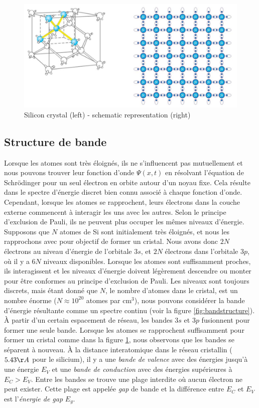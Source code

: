 \begin{figure}[htbp]
	\centering
	\includegraphics[width=12cm]{figures/ch01/crystal.jpg}
	\caption{Silicon crystal (left) - schematic representation (right)}
	\label{fig:crystal}
\end{figure} 

\subsection{Structure de bande}
Lorsque les atomes sont très éloignés, ils ne s'influencent pas mutuellement et nous pouvons trouver leur fonction d'onde $\Psi(x, t)$ en résolvant l'équation de Schrödinger pour un seul électron en orbite autour d'un noyau fixe. Cela résulte dans le spectre d'énergie discret bien connu associé à chaque fonction d'onde. Cependant, lorsque les atomes se rapprochent, leurs électrons dans la couche externe commencent à interagir les uns avec les autres. Selon le principe d'exclusion de Pauli, ils ne peuvent plus occuper les mêmes niveaux d'énergie.\\
Supposons que $N$ atomes de Si sont initialement très éloignés, et nous les rapprochons avec pour objectif de former un cristal. Nous avons donc $2N$ électrons au niveau d'énergie de l'orbitale $3s$, et $2N$ électrons dans l'orbitale $3p$, où il y a $6N$ niveaux disponibles. Lorsque les atomes sont suffisamment proches, ils interagissent et les niveaux d'énergie doivent légèrement descendre ou monter pour être conformes au principe d'exclusion de Pauli. Les niveaux sont toujours discrets, mais étant donné que $N$, le nombre d'atomes dans le cristal, est un nombre énorme ($N \approx 10^{20}$ atomes par cm$^3$), nous pouvons considérer la bande d'énergie résultante comme un spectre continu (voir la figure \ref{fig:bandstructure}). À partir d'un certain espacement de réseau, les bandes $3s$ et $3p$ fusionnent pour former une seule bande. Lorsque les atomes se rapprochent suffisamment pour former un cristal comme dans la figure \ref{fig:crystal}, nous observons que les bandes se séparent à nouveau. À la distance interatomique dans le réseau cristallin ($5.43 \AA$ pour le silicium), il y a une \emph{bande de valence} avec des énergies jusqu'à une énergie $E_V$ et une \emph{bande de conduction} avec des énergies supérieures à $E_C > E_V$. Entre les bandes se trouve une plage interdite où aucun électron ne peut exister. Cette plage est appelée \emph{gap} de bande et la différence entre $E_C$ et $E_V$ est l'\emph{énergie de gap} $E_g$.

